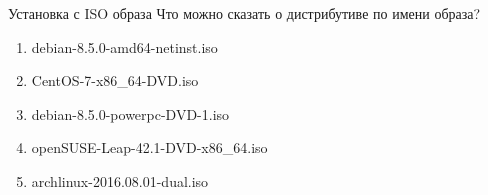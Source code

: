 \begin{frame}{Установка с ISO образа}
    Что можно сказать о дистрибутиве по имени образа?
	\begin{enumerate}
            \item debian-8.5.0-amd64-netinst.iso
            \item CentOS-7-x86\_64-DVD.iso
            \item debian-8.5.0-powerpc-DVD-1.iso
            \item openSUSE-Leap-42.1-DVD-x86\_64.iso
            \item archlinux-2016.08.01-dual.iso
	\end{enumerate}
\end{frame}
